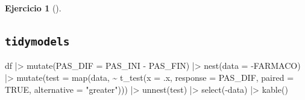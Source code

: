 \documentclass[
  a4paper,
]{scrreport}
\newenvironment{Shaded}{\begin{snugshade}}{\end{snugshade}}
\newcommand{\AttributeTok}[1]{\textcolor[rgb]{0.40,0.45,0.13}{#1}}
\newcommand{\ConstantTok}[1]{\textcolor[rgb]{0.56,0.35,0.01}{#1}}
\newcommand{\FunctionTok}[1]{\textcolor[rgb]{0.28,0.35,0.67}{#1}}
\newcommand{\NormalTok}[1]{\textcolor[rgb]{0.00,0.23,0.31}{#1}}
\newcommand{\SpecialCharTok}[1]{\textcolor[rgb]{0.37,0.37,0.37}{#1}}
\newcommand{\StringTok}[1]{\textcolor[rgb]{0.13,0.47,0.30}{#1}}
\theoremstyle{definition}
\newtheorem{exercise}{Ejercicio}[chapter]
\theoremstyle{remark}
\begin{document}
\begin{exercise}[]
\begin{enumerate}
\begin{tcolorbox}
  \section{\texorpdfstring{\texttt{tidymodels}}{tidymodels}}

\begin{Shaded}
\begin{Highlighting}[]
\NormalTok{df }\SpecialCharTok{|\textgreater{}} 
\FunctionTok{mutate}\NormalTok{(}\AttributeTok{PAS\_DIF =}\NormalTok{ PAS\_INI }\SpecialCharTok{{-}}\NormalTok{ PAS\_FIN) }\SpecialCharTok{|\textgreater{}} 
\FunctionTok{nest}\NormalTok{(}\AttributeTok{data =} \SpecialCharTok{{-}}\NormalTok{FARMACO) }\SpecialCharTok{|\textgreater{}} 
    \FunctionTok{mutate}\NormalTok{(}\AttributeTok{test =} \FunctionTok{map}\NormalTok{(data, }\SpecialCharTok{\textasciitilde{}} \FunctionTok{t\_test}\NormalTok{(}\AttributeTok{x =}\NormalTok{ .x, }\AttributeTok{response =}\NormalTok{ PAS\_DIF, }\AttributeTok{paired =} \ConstantTok{TRUE}\NormalTok{, }\AttributeTok{alternative =} \StringTok{"greater"}\NormalTok{))) }\SpecialCharTok{|\textgreater{}} 
    \FunctionTok{unnest}\NormalTok{(test) }\SpecialCharTok{|\textgreater{}}
    \FunctionTok{select}\NormalTok{(}\SpecialCharTok{{-}}\NormalTok{data) }\SpecialCharTok{|\textgreater{}} 
    \FunctionTok{kable}\NormalTok{()}
\end{Highlighting}
\end{Shaded}


\end{tcolorbox}
\end{enumerate}
\end{exercise}
\end{document}
